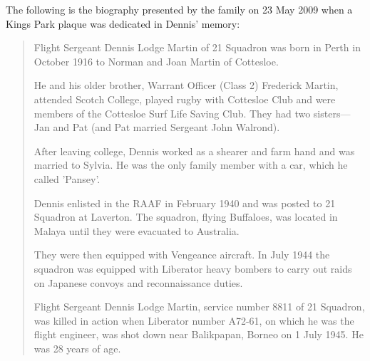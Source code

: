 
The following is the biography presented by the family on 23 May 2009 when a Kings Park plaque was dedicated in Dennis' memory:\cite{KingsParkDennisMartin}

\begin{quotation}
Flight Sergeant Dennis Lodge Martin of 21 Squadron was born in Perth in October 1916 to Norman and Joan Martin of Cottesloe.

He and his older brother, Warrant Officer (Class 2) Frederick Martin, attended Scotch College, played rugby with Cottesloe Club and were members of the Cottesloe Surf Life Saving Club.
They had two sisters---Jan and Pat (and Pat married Sergeant John Walrond).

After leaving college, Dennis worked as a shearer and farm hand and was married to Sylvia. He was the only family member with a car, which he called 'Pansey'.

Dennis enlisted in the RAAF in February 1940 and was posted to 21 Squadron at Laverton. The squadron, flying Buffaloes, was located in Malaya until they were evacuated to Australia.

They were then equipped with Vengeance aircraft. In July 1944 the squadron was equipped with Liberator heavy bombers to carry out raids on Japanese convoys and reconnaissance duties.

Flight Sergeant Dennis Lodge Martin, service number 8811 of 21 Squadron, was killed in action when Liberator number A72-61,
on which he was the flight engineer, was shot down near Balikpapan, Borneo on 1 July 1945. He was 28 years of age.
\end{quotation}
